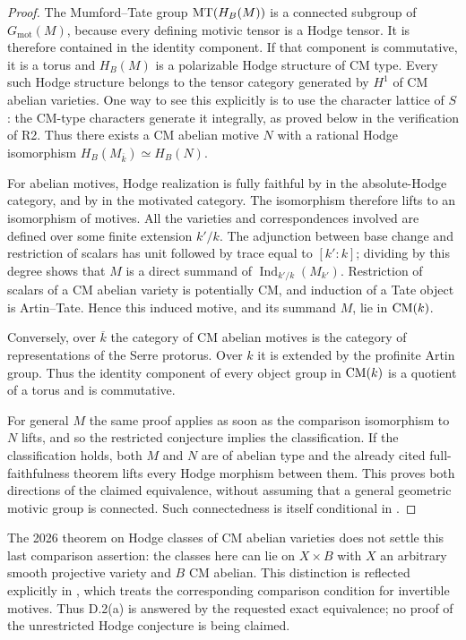 \begin{proof}
The Mumford--Tate group $\operatorname{MT}(H_B(M))$ is a connected subgroup of
$G_{\mathrm{mot}}(M)$, because every defining motivic tensor is a
Hodge tensor.  It is therefore contained in the identity component.
If that component is commutative, it is a torus and $H_B(M)$ is a
polarizable Hodge structure of CM type.  Every such Hodge structure
belongs to the tensor category generated by $H^1$ of CM abelian
varieties.  One way to see this explicitly is to use the character
lattice of $S$: the CM-type characters generate it integrally, as
proved below in the verification of R2.  Thus there exists a CM
abelian motive $N$ with a rational Hodge isomorphism
$H_B(M_{\overline k})\simeq H_B(N)$.

For abelian motives, Hodge realization is fully faithful by
\citet[Theorem 8.25, restating Main Theorem 2.11]{c_delignehodge1982}
in the absolute-Hodge category, and by
\citet[Theorem 0.6.2 and \S6.3]{c_andre1996} in the motivated
category.  The isomorphism therefore lifts to an isomorphism of
motives.  All the varieties and correspondences involved are defined
over some finite extension $k'/k$.  The adjunction between base
change and restriction of scalars has unit followed by trace equal
to $[k':k]$; dividing by this degree shows that $M$ is a direct summand
of $\operatorname{Ind}_{k'/k}(M_{k'})$.  Restriction of scalars of a
CM abelian variety is potentially CM, and induction of a Tate object
is Artin--Tate.  Hence this induced motive, and its summand $M$, lie
in $\operatorname{CM}(k)$.

Conversely, over $\overline k$ the category of CM abelian motives is
the category of representations of the Serre protorus.  Over $k$ it
is extended by the profinite Artin group.  Thus the identity component
of every object group in $\operatorname{CM}(k)$ is a quotient of a torus and is
commutative.

For general $M$ the same proof applies as soon as the comparison
isomorphism to $N$ lifts, and so the restricted conjecture implies
the classification.  If the classification holds, both $M$ and $N$
are of abelian type and the already cited full-faithfulness theorem
lifts every Hodge morphism between them.  This proves both directions
of the claimed equivalence, without assuming that a general geometric
motivic group is connected.  Such connectedness is itself conditional
in \citet[Propositions 8.22(a) and 8.23(b)]{c_delignehodge1982}.
\end{proof}

The 2026 theorem on Hodge classes of CM abelian varieties does not
settle this last comparison assertion: the classes here can lie on
$X\times B$ with $X$ an arbitrary smooth projective variety and $B$
CM abelian.  This distinction is reflected explicitly in
\citet[Remark 2.26(i), following Theorem 2.24]{DKahnOtsubo2026},
which treats the corresponding comparison condition for invertible
motives.  Thus D.2(a) is answered by the requested exact equivalence;
no proof of the unrestricted Hodge conjecture is being claimed.

